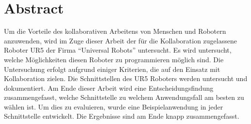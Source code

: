 \section*{Abstract}
\label{abstract}

Um die Vorteile des kollaborativen Arbeitens von Menschen und Robotern anzuwenden, wird im Zuge dieser Arbeit der für die Kollaboration zugelassene Roboter UR5 der Firma ``Universal Robots'' untersucht. Es wird untersucht, welche Möglichkeiten diesen Roboter zu programmieren möglich sind. Die Untersuchung erfolgt aufgrund einiger Kriterien, die auf den Einsatz mit Kollaboration zielen.
Die Schnittstellen des UR5 Roboters werden untersucht und dokumentiert.
Am Ende dieser Arbeit wird eine Entscheidungsfindung zusammengefasst, welche Schnittstelle zu welchem Anwendungsfall am besten zu wählen ist. Um dies zu evaluieren, wurde eine Beispielanwendung in jeder Schnittstelle entwickelt. Die Ergebnisse sind am Ende knapp zusammengefasst.